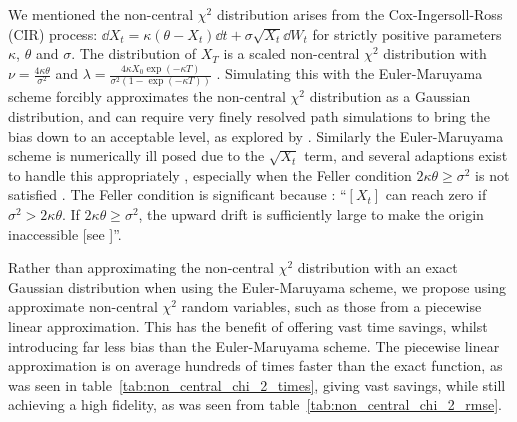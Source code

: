 \documentclass[9pt,a4paper,english]{extarticle}
\begin{document}
We mentioned the non-central $ \chi^2 $ distribution arises from the Cox-Ingersoll-Ross (CIR) process: $ \dd{X_t} = \kappa (\theta - X_t) \dd{t} + \sigma \sqrt{X_t} \dd{W_t} $ for strictly positive parameters $ \kappa $, $ \theta $ and $ \sigma $. The distribution of $ X_T $ is a scaled non-central $ \chi^2 $ distribution with $ \nu = \tfrac{4\kappa\theta}{\sigma^2} $ and $ \lambda = \tfrac{4\kappa X_0 \exp(-\kappa T)}{\sigma^2(1 - \exp(-\kappa T))} $ \citep{cox1985theory} \citep[pages~67--68]{munk2011fixed}. Simulating this with the Euler-Maruyama scheme forcibly approximates the non-central $ \chi^2 $ distribution as a Gaussian distribution, and can require very finely resolved path simulations to bring the bias down to an acceptable level, as explored by \citet{broadie2006exact}. Similarly the Euler-Maruyama scheme is numerically ill posed due to the $ \sqrt{X_t} $ term, and several adaptions exist to handle this appropriately \citep{deelstra1998convergence,lord2010comparison,berkaoui2008euler,higham2002strong,alfonsi2005discretization,alfonsi2008second,alfonsi2010high,dereich2012euler,cozma2020strong_euler,gyongy2011note}, especially when the Feller condition $ 2\kappa\theta \geq \sigma^2 $ is not satisfied \citep{feller1951two,gyongy1998note}. The Feller condition is significant because \citep[page~391]{cox1985theory}: ``\textit{$ [X_t] $} can reach zero if $ \sigma^2 > 2\kappa \theta $. If $ 2 \kappa \theta \geq \sigma^2 $, the upward drift is sufficiently large to make the origin inaccessible [see \citet{feller1951two}]''.

Rather than approximating the non-central $ \chi^2 $ distribution with an exact Gaussian distribution when using the Euler-Maruyama scheme, we propose using approximate non-central $ \chi^2 $ random variables, such as those from a piecewise linear approximation. This has the benefit of offering vast time savings, whilst introducing far less bias than the Euler-Maruyama scheme. The piecewise linear approximation is on average hundreds of times faster than the exact function, as was seen in table~\ref{tab:non_central_chi_2_times}, giving vast savings, while still achieving a high fidelity, as was seen from table~\ref{tab:non_central_chi_2_rmse}.
\end{document}
